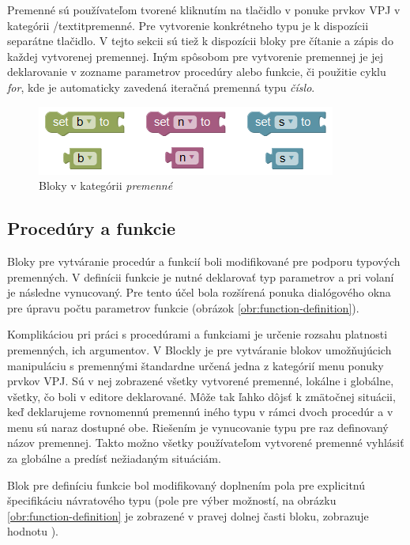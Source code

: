 Premenné sú používateľom tvorené kliknutím na tlačidlo v ponuke prvkov VPJ v kategórii /textit{premenné}. Pre vytvorenie konkrétneho typu je k dispozícii separátne tlačidlo. V tejto sekcii sú tiež k dispozícii bloky pre čítanie a zápis do každej vytvorenej premennej. Iným spôsobom pre vytvorenie premennej je jej deklarovanie v zozname parametrov procedúry alebo funkcie, či použitie cyklu \textit{for}, kde je automaticky zavedená iteračná premenná typu \textit{číslo}.

\vspace{3cm}

\begin{figure}[bh!]
\centerline{\includegraphics[]{images/variables-blocks}}
\caption[Bloky v kategórii \textit{premenné}]{Bloky v kategórii \textit{premenné}}
\label{obr:variables-blocks}
\end{figure}


\newpage

\subsection{Procedúry a funkcie}
Bloky pre vytváranie procedúr a funkcií boli modifikované pre podporu typových premenných. V definícii funkcie je nutné deklarovať typ parametrov a pri volaní je následne vynucovaný. Pre tento účel bola rozšírená ponuka dialógového okna pre úpravu počtu parametrov funkcie (obrázok \ref{obr:function-definition}).

Komplikáciou pri práci s procedúrami a funkciami je určenie rozsahu platnosti premenných, ich argumentov. V Blockly je pre vytváranie blokov umožňujúcich manipuláciu s premennými štandardne určená jedna z kategórií menu ponuky prvkov VPJ. Sú v nej zobrazené všetky vytvorené premenné, lokálne i globálne, všetky, čo boli v editore deklarované. Môže tak ľahko dôjsť k zmätočnej situácii, keď deklarujeme rovnomennú premennú iného typu v rámci dvoch procedúr a v menu sú naraz dostupné obe. Riešením je vynucovanie typu pre raz definovaný názov premennej. Takto možno všetky používateľom vytvorené premenné vyhlásiť za globálne a predísť nežiadaným situáciám.

Blok pre definíciu funkcie bol modifikovaný doplnením pola pre explicitnú špecifikáciu návratového typu (pole pre výber možností, na obrázku \ref{obr:function-definition} je zobrazené v pravej dolnej časti bloku, zobrazuje hodnotu ).

